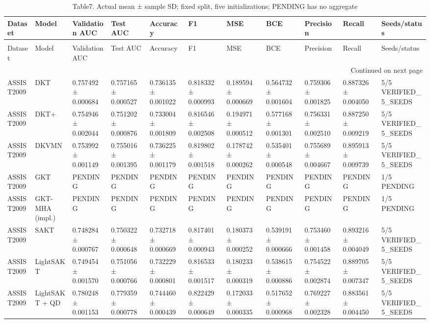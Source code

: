 \begin{longtable}{lllllllllll}
\caption{Table7. Actual mean ± sample SD; fixed split, five initializations; PENDING has no aggregate} \\
\toprule
Dataset & Model & Validation AUC & Test AUC & Accuracy & F1 & MSE & BCE & Precision & Recall & Seeds/status \\
\midrule
\endfirsthead
\caption[]{Table7. Actual mean ± sample SD; fixed split, five initializations; PENDING has no aggregate} \\
\toprule
Dataset & Model & Validation AUC & Test AUC & Accuracy & F1 & MSE & BCE & Precision & Recall & Seeds/status \\
\midrule
\endhead
\midrule
\multicolumn{11}{r}{Continued on next page} \\
\midrule
\endfoot
\bottomrule
\endlastfoot
ASSIST2009 & DKT & 0.757492 ± 0.000684 & 0.757165 ± 0.000527 & 0.736135 ± 0.001022 & 0.818332 ± 0.000993 & 0.189594 ± 0.000669 & 0.564732 ± 0.001604 & 0.759306 ± 0.001825 & 0.887326 ± 0.004050 & 5/5 VERIFIED\_5\_SEEDS \\
ASSIST2009 & DKT+ & 0.754946 ± 0.002044 & 0.751202 ± 0.000876 & 0.733004 ± 0.001809 & 0.816546 ± 0.002508 & 0.194971 ± 0.000512 & 0.577168 ± 0.001301 & 0.756331 ± 0.002510 & 0.887250 ± 0.009219 & 5/5 VERIFIED\_5\_SEEDS \\
ASSIST2009 & DKVMN & 0.753992 ± 0.001149 & 0.755016 ± 0.001395 & 0.736225 ± 0.001179 & 0.819802 ± 0.001518 & 0.178742 ± 0.000262 & 0.535401 ± 0.000548 & 0.755689 ± 0.004667 & 0.895913 ± 0.009739 & 5/5 VERIFIED\_5\_SEEDS \\
ASSIST2009 & GKT & PENDING & PENDING & PENDING & PENDING & PENDING & PENDING & PENDING & PENDING & 1/5 PENDING \\
ASSIST2009 & GKT-MHA (impl.) & PENDING & PENDING & PENDING & PENDING & PENDING & PENDING & PENDING & PENDING & 1/5 PENDING \\
ASSIST2009 & SAKT & 0.748284 ± 0.000767 & 0.750322 ± 0.000648 & 0.732718 ± 0.000669 & 0.817401 ± 0.000943 & 0.180373 ± 0.000252 & 0.539191 ± 0.000666 & 0.753460 ± 0.001458 & 0.893216 ± 0.004049 & 5/5 VERIFIED\_5\_SEEDS \\
ASSIST2009 & LightSAKT & 0.749454 ± 0.001570 & 0.751056 ± 0.000766 & 0.732229 ± 0.000801 & 0.816533 ± 0.001517 & 0.180233 ± 0.000319 & 0.538615 ± 0.000886 & 0.754522 ± 0.002874 & 0.889705 ± 0.007347 & 5/5 VERIFIED\_5\_SEEDS \\
ASSIST2009 & LightSAKT + QD & 0.780248 ± 0.001153 & 0.779359 ± 0.000778 & 0.744460 ± 0.000439 & 0.822429 ± 0.000649 & 0.172033 ± 0.000335 & 0.517652 ± 0.000968 & 0.769227 ± 0.002328 & 0.883561 ± 0.004450 & 5/5 VERIFIED\_5\_SEEDS \\

\end{longtable}

